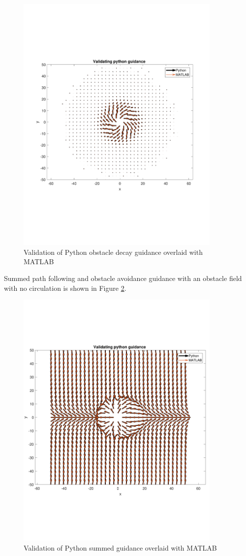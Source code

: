 \documentclass[numbered,pdftex]{ohio-etd}
\begin{document}
\begin{figure}[H]
	\centering
	\includegraphics[trim=0 140 0 140,clip,width=10cm]{PaperFigures/Methods/resultsPython/obstacleWithDecayAndCirculation}
	\caption{Validation of Python obstacle decay guidance overlaid with MATLAB}
	\label{fig:valPythonAvoidanceDecay}
\end{figure}

Summed path following and obstacle avoidance guidance with an obstacle field with no circulation is shown in Figure \ref{fig:valPythonSummed}.

\begin{figure}[H]
	\centering
	\includegraphics[trim=0 140 0 140,clip,width=10cm]{PaperFigures/Methods/resultsPython/summedFields}
	\caption{Validation of Python summed guidance overlaid with MATLAB}
	\label{fig:valPythonSummed}
\end{figure}
\end{document}
